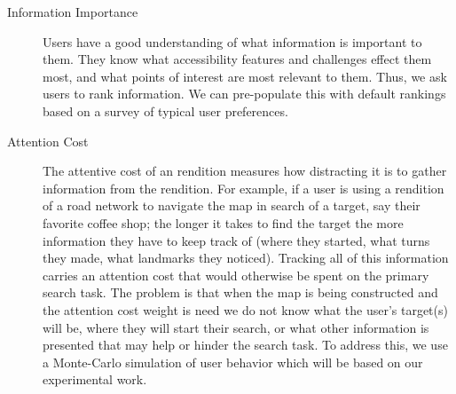 \begin{description}
\item[Information Importance]
Users have a good understanding of what information is important to them. They know what accessibility features and challenges effect them most, and what points of interest are most relevant to them. %
Thus, we ask users to rank information. %
We can pre-populate this with default rankings based on a survey of typical user preferences. 

\item[Attention Cost]
The attentive cost of an rendition measures how distracting it is to gather information from the rendition. For example, if a user is using a rendition of a road network to navigate the map in search of a target, say their favorite coffee shop;  the longer it takes to find the target the more information they have to keep track of (\eg where they started, what turns they made, what landmarks they noticed). Tracking all of this information carries an attention cost that would otherwise be spent on the primary search task.
The problem is that when the map is being constructed and the attention cost weight is need we do not know what the user's target(s) will be, where they will start their search, or what other information is presented that may help or hinder the search task. To address this, we use a Monte-Carlo simulation of user behavior which will be based on our experimental work. %


\end{description}
